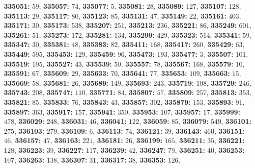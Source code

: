 \textsf{\bfseries 335051:} $59$, \textsf{\bfseries 335057:} $74$, \textsf{\bfseries 335077:} $5$, \textsf{\bfseries 335081:} $28$, \textsf{\bfseries 335089:} $127$, \textsf{\bfseries 335107:} $128$, \textsf{\bfseries 335113:} $29$, \textsf{\bfseries 335117:} $80$, \textsf{\bfseries 335123:} $85$, \textsf{\bfseries 335131:} $47$, \textsf{\bfseries 335149:} $22$, \textsf{\bfseries 335161:} $403$, \textsf{\bfseries 335171:} $30$, \textsf{\bfseries 335173:} $538$, \textsf{\bfseries 335207:} $251$, \textsf{\bfseries 335213:} $236$, \textsf{\bfseries 335221:} $86$, \textsf{\bfseries 335249:} $601$, \textsf{\bfseries 335261:} $51$, \textsf{\bfseries 335273:} $172$, \textsf{\bfseries 335281:} $134$, \textsf{\bfseries 335299:} $429$, \textsf{\bfseries 335323:} $514$, \textsf{\bfseries 335341:} $59$, \textsf{\bfseries 335347:} $30$, \textsf{\bfseries 335381:} $48$, \textsf{\bfseries 335383:} $82$, \textsf{\bfseries 335411:} $168$, \textsf{\bfseries 335417:} $260$, \textsf{\bfseries 335429:} $63$, \textsf{\bfseries 335449:} $595$, \textsf{\bfseries 335453:} $129$, \textsf{\bfseries 335459:} $96$, \textsf{\bfseries 335473:} $193$, \textsf{\bfseries 335477:} $3$, \textsf{\bfseries 335507:} $101$, \textsf{\bfseries 335519:} $195$, \textsf{\bfseries 335527:} $43$, \textsf{\bfseries 335539:} $50$, \textsf{\bfseries 335557:} $78$, \textsf{\bfseries 335567:} $168$, \textsf{\bfseries 335579:} $10$, \textsf{\bfseries 335591:} $67$, \textsf{\bfseries 335609:} $29$, \textsf{\bfseries 335633:} $70$, \textsf{\bfseries 335641:} $77$, \textsf{\bfseries 335653:} $109$, \textsf{\bfseries 335663:} $15$, \textsf{\bfseries 335669:} $58$, \textsf{\bfseries 335681:} $26$, \textsf{\bfseries 335689:} $149$, \textsf{\bfseries 335693:} $243$, \textsf{\bfseries 335719:} $108$, \textsf{\bfseries 335729:} $246$, \textsf{\bfseries 335743:} $208$, \textsf{\bfseries 335747:} $110$, \textsf{\bfseries 335771:} $84$, \textsf{\bfseries 335807:} $57$, \textsf{\bfseries 335809:} $257$, \textsf{\bfseries 335813:} $353$, \textsf{\bfseries 335821:} $85$, \textsf{\bfseries 335833:} $76$, \textsf{\bfseries 335843:} $43$, \textsf{\bfseries 335857:} $302$, \textsf{\bfseries 335879:} $153$, \textsf{\bfseries 335893:} $91$, \textsf{\bfseries 335897:} $363$, \textsf{\bfseries 335917:} $157$, \textsf{\bfseries 335941:} $350$, \textsf{\bfseries 335953:} $107$, \textsf{\bfseries 335957:} $17$, \textsf{\bfseries 335999:} $478$, \textsf{\bfseries 336029:} $248$, \textsf{\bfseries 336031:} $46$, \textsf{\bfseries 336041:} $122$, \textsf{\bfseries 336059:} $85$, \textsf{\bfseries 336079:} $549$, \textsf{\bfseries 336101:} $275$, \textsf{\bfseries 336103:} $279$, \textsf{\bfseries 336109:} $6$, \textsf{\bfseries 336113:} $74$, \textsf{\bfseries 336121:} $39$, \textsf{\bfseries 336143:} $460$, \textsf{\bfseries 336151:} $46$, \textsf{\bfseries 336157:} $47$, \textsf{\bfseries 336163:} $221$, \textsf{\bfseries 336181:} $26$, \textsf{\bfseries 336199:} $165$, \textsf{\bfseries 336211:} $35$, \textsf{\bfseries 336221:} $128$, \textsf{\bfseries 336223:} $39$, \textsf{\bfseries 336227:} $117$, \textsf{\bfseries 336239:} $42$, \textsf{\bfseries 336247:} $79$, \textsf{\bfseries 336251:} $40$, \textsf{\bfseries 336253:} $107$, \textsf{\bfseries 336263:} $138$, \textsf{\bfseries 336307:} $31$, \textsf{\bfseries 336317:} $38$, \textsf{\bfseries 336353:} $126$, 

